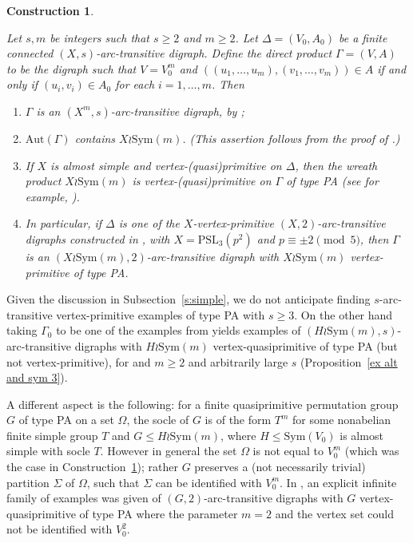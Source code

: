\documentclass[11pt]{amsart}
\newtheorem{construction}[theorem]{Construction}
\newcommand{\Aut}{\mathrm{Aut}}
\newcommand{\PSL}{\mathrm{PSL}}
\newcommand{\Sym}{\mathrm{Sym}}
\begin{document}
\begin{construction}\label{ex:PA}
{\rm 
    Let $s, m$ be integers such that $s\geq2$ and  $m\geq2$. Let $\Delta=(V_0,A_0)$ be a finite connected $(X,s)$-arc-transitive digraph. Define the \emph{direct product} $\Gamma=(V,A)$ to be the  digraph such that $V=V_0^m$ and $((u_1,\dots,u_m),(v_1,\dots,v_m))\in A$ if and only if $(u_i,v_i)\in A_0$ for each $i=1,\dots,m$. Then
    \begin{enumerate}
        \item[(a)]  $\Gamma$ is an $(X^m,s)$-arc-transitive digraph, by \cite[Lemma 2.7]{quasi};
        \item[(b)]  $\Aut(\Gamma)$ contains $X\wr \Sym(m)$. (This assertion follows from the proof of  \cite[Proposition 4.2]{Praeger}.)
        \item[(c)] If $X$  is almost simple and vertex-(quasi)primitive on $\Delta$, then the wreath product $X\wr \Sym(m)$ is  vertex-(quasi)prim\-it\-ive on $\Gamma$ of type PA (see for example, \cite[Theorem 5.18]{csaba}). 
        \item[(d)] In particular, if $\Delta$ is one of the $X$-vertex-primitive $(X,2)$-arc-transitive digraphs constructed in \cite[Theorem 1.1]{infinite}, with $X=\PSL_3(p^2)$ and $p\equiv \pm 2 \pmod{5}$, then $\Gamma$ is an $(X\wr \Sym(m),2)$-arc-transitive digraph with $X\wr \Sym(m)$ vertex-primitive of type PA.
    \end{enumerate}
    }
\end{construction}
Given the discussion in Subsection~\ref{s:simple}, we do not anticipate finding $s$-arc-transitive vertex-primitive examples of type PA with $s\ge3$. 
On the other hand taking $\Gamma_0$ to be one of the examples from \cite{CLP} yields examples of $(H\wr \Sym(m),s)$-arc-transitive digraphs with $H\wr \Sym(m)$ vertex-quasiprimitive of type PA (but not vertex-primitive), for and $m\geqslant2$ and arbitrarily large $s$ (Proposition~\ref{ex alt and sym 3}). 

A different aspect is the following: for a finite quasiprimitive permutation group $G$ of type PA on a set $\Omega$, the socle of $G$ is of the form $T^m$ for some nonabelian finite simple group $T$ and $G\leq H\wr \Sym(m)$, where $H\leq \Sym(V_0)$ is almost simple with socle $T$. However in general the set $\Omega$ is not equal to $V_0^m$ (which was the case  in Construction~\ref{ex:PA}); rather $G$ preserves a (not necessarily trivial) partition $\Sigma$ of $\Omega$, such that $\Sigma$ can be identified with  $V_0^m$. In \cite[Example 2.3]{quasi}, an explicit infinite family of  examples was given of $(G,2)$-arc-transitive digraphs with $G$ vertex-quasiprimitive of type PA where the parameter $m=2$ and the vertex set could not be identified with $V_0^2$. 
\end{document}
